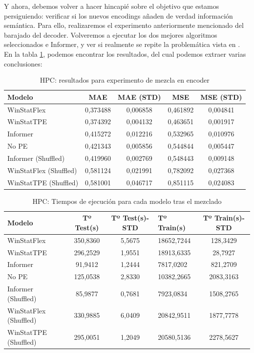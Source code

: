 Y ahora, debemos volver a hacer hincapié sobre el objetivo que estamos persiguiendo: verificar si los nuevos encodings añaden de verdad información semántica. Para ello, realizaremos el experimento anteriormente mencionado del barajado del decoder. Volveremos a ejecutar los dos mejores algoritmos seleccionados e Informer, y ver si realmente se repite la problemática vista en \cite{zeng2022transformerseffectivetimeseries}.\\

En la tabla \ref{hpcresultados_modelos}, podemos encontrar los resultados, del cual podemos extraer varias conclusiones:
\begin{table}[ht]
	\centering
	\begin{tabular}{l|c|c|c|c}
		\toprule
		Modelo & {MAE} & {MAE (STD)} & {MSE} & {MSE (STD)}  \\
		\midrule
		WinStatFlex & 0,373488 & 0,006858 & 0,461892 & 0,004841 \\
		WinStatTPE & 0,374392 & 0,004132 & 0,463651 & 0,001917 \\
		Informer & 0,415272 & 0,012216 & 0,532965 & 0,010976 \\
		No PE & 0,421343 & 0,005856 & 0,544844 & 0,005447 \\
		Informer (Shuffled) & 0,419960 & 0,002769 & 0,548443 & 0,009148 \\
		WinStatFlex (Shuffled) & 0,581124 & 0,021991 & 0,782092 & 0,027368 \\
		WinStatTPE (Shuffled) & 0,581001 & 0,046717 & 0,851115 & 0,024083 \\
		\bottomrule
	\end{tabular}
	\caption{HPC: resultados para experimento de mezcla en encoder}
	\label{hpcresultados_modelos}
\end{table}


\begin{table}[ht]
	\centering
	\begin{tabular}{l|c|c|l|c}
		\toprule
		Modelo & {Tº Test(s)} & {Tº Test(s)-STD} & {Tº Train(s)} & {Tº Train(s)-STD} \\
		\midrule
		WinStatFlex & 350,8360 & 5,5675 & 18652,7244 & 128,3429 \\
		WinStatTPE & 296,2529 & 1,9551 & 18913,6335 & 28,7927 \\
		Informer & 91,9412 & 1,2444 & 7817,0202 & 821,2709 \\
		No PE & 125,0538 & 2,8330 & 10382,2665 & 2083,3163 \\
		Informer (Shuffled) & 85,9877 & 0,7681 & 7923,0834 & 1508,2765 \\
		WinStatFlex (Shuffled) & 330,9885 & 6,0409 & 20842,9511 & 1877,7778 \\
		WinStatTPE (Shuffled) & 295,0051 & 1,2049 & 20580,5136 & 2278,5627 \\
		\bottomrule
	\end{tabular}
	\caption{HPC: Tiempos de ejecución para cada modelo tras el mezclado}
	\label{hpc_tiempos_modelos}
\end{table}

